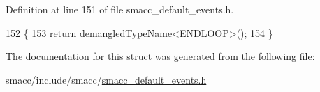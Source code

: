 Definition at line 151 of file smacc\+\_\+default\+\_\+events.\+h.


\begin{DoxyCode}
152   \{
153     \textcolor{keywordflow}{return} demangledTypeName<ENDLOOP>();
154   \}
\end{DoxyCode}


The documentation for this struct was generated from the following file\+:\begin{DoxyCompactItemize}
\item 
smacc/include/smacc/\hyperlink{smacc__default__events_8h}{smacc\+\_\+default\+\_\+events.\+h}\end{DoxyCompactItemize}
